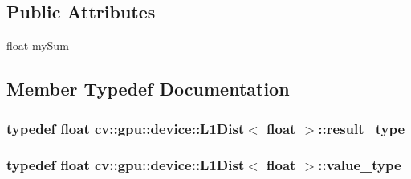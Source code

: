 \subsection*{Public Attributes}
\begin{DoxyCompactItemize}
\item 
float \hyperlink{structcv_1_1gpu_1_1device_1_1L1Dist_3_01float_01_4_ae9cfbf73b6c6952959d26a04388b7cfe}{my\-Sum}
\end{DoxyCompactItemize}


\subsection{Member Typedef Documentation}
\hypertarget{structcv_1_1gpu_1_1device_1_1L1Dist_3_01float_01_4_a4f016b196709727ea41147bcf9d1f106}{
\subsubsection[{result\-\_\-type}]{\setlength{\rightskip}{0pt plus 5cm}typedef float {\bf cv\-::gpu\-::device\-::\-L1\-Dist}$<$ float $>$\-::{\bf result\-\_\-type}}}\label{structcv_1_1gpu_1_1device_1_1L1Dist_3_01float_01_4_a4f016b196709727ea41147bcf9d1f106}
\hypertarget{structcv_1_1gpu_1_1device_1_1L1Dist_3_01float_01_4_ac97bce7e8af244bd4ea72d5cec508df1}{
\subsubsection[{value\-\_\-type}]{\setlength{\rightskip}{0pt plus 5cm}typedef float {\bf cv\-::gpu\-::device\-::\-L1\-Dist}$<$ float $>$\-::{\bf value\-\_\-type}}}\label{structcv_1_1gpu_1_1device_1_1L1Dist_3_01float_01_4_ac97bce7e8af244bd4ea72d5cec508df1}


